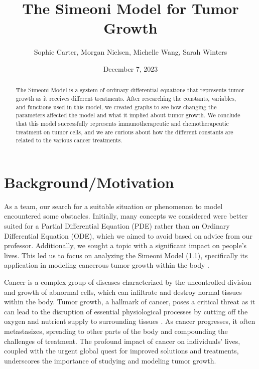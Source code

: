 \documentclass[11pt,reqno]{amsart}
\begin{document}
\title{The Simeoni Model for Tumor Growth}
\author{Sophie Carter, Morgan Nielsen, Michelle Wang, Sarah Winters}
\date{December 7, 2023}


\maketitle

\begin{abstract}
The Simeoni Model is a system of ordinary differential equations that represents tumor growth as it receives different treatments. After researching the constants, variables, and functions used in this model, we created graphs to see how changing the parameters affected the model and what it implied about tumor growth. We conclude that this model successfully represents immunotherapeutic and chemotherapeutic treatment on tumor cells, and we are curious about how the different constants are related to the various cancer treatments. 
\end{abstract}

\section{Background/Motivation}
As a team, our search for a suitable situation or phenomenon to model encountered some obstacles. Initially, many concepts we considered were better suited for a Partial Differential Equation (PDE) rather than an Ordinary Differential Equation (ODE), which we aimed to avoid based on advice from our professor. Additionally, we sought a topic with a significant impact on people's lives. This led us to focus on analyzing the Simeoni Model (1.1), specifically its application in modeling cancerous tumor growth within the body \cite{Koziol_Falls_Schnitzer_2020}.

Cancer is a complex group of diseases characterized by the uncontrolled division and growth of abnormal cells, which can infiltrate and destroy normal tissues within the body. Tumor growth, a hallmark of cancer, poses a critical threat as it can lead to the disruption of essential physiological processes by cutting off the oxygen and nutrient supply to surrounding tissues \cite{Cancer_Research_2023}. As cancer progresses, it often metastasizes, spreading to other parts of the body and compounding the challenges of treatment. The profound impact of cancer on individuals' lives, coupled with the urgent global quest for improved solutions and treatments, underscores the importance of studying and modeling tumor growth.
\end{document}
